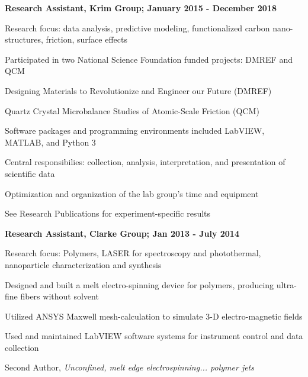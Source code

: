 \documentclass[letterpaper,final]{memoir}
\newcommand{\Sep}{\vspace{1.0em}}
\newcommand{\SmallSep}{\vspace{0.4em}}
\newcommand{\CVItem}[1]
	{\textbf{\color{Blue} #1}}
\begin{document}
\Sep

\CVItem{Research Assistant, Krim Group; January 2015 - December 2018} 
\begin{compactitem}[\color{Blue}$\circ$]
   
    \SmallSep

    \item Research focus: data analysis, predictive modeling, functionalized carbon nano-structures, friction, surface effects
    \item Participated in two National Science Foundation funded projects: DMREF and QCM
    \item Designing Materials to Revolutionize and Engineer our Future (DMREF)
    \item Quartz Crystal Microbalance Studies of Atomic-Scale Friction (QCM)
    \item Software packages and programming environments included LabVIEW, MATLAB, and Python 3
    \item Central responsibilies: collection, analysis, interpretation, and presentation of scientific data
    \item Optimization and organization of the lab group's time and equipment
    \item See Research Publications for experiment-specific results
\end{compactitem}

\Sep

\CVItem{Research Assistant, Clarke Group; Jan 2013 - July 2014}
\begin{compactitem}[\color{Blue}$\circ$]
    
    \SmallSep

    \item Research focus: Polymers, LASER for spectroscopy and photothermal, nanoparticle characterization and synthesis
    \item Designed and built a melt electro-spinning device for polymers, producing ultra-fine fibers without solvent
    \item Utilized ANSYS Maxwell mesh-calculation to simulate 3-D electro-magnetic fields
    \item Used and maintained LabVIEW software systems for instrument control and data collection
    \item Second Author, \textit{Unconfined, melt edge electrospinning... polymer jets}

\end{compactitem}

\Sep
\end{document}
